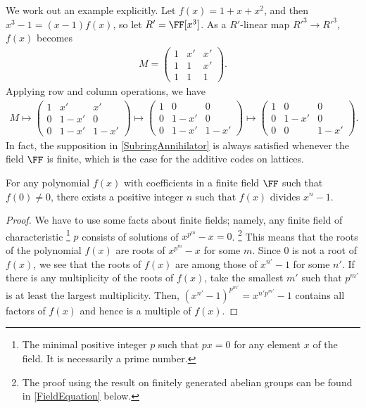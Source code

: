 We work out an example explicitly.
Let $f(x) = 1 + x + x^2$, and then $x^3 -1 = (x-1)f(x)$,
so let $R' = \FF[x^3]$.
As a $R'$-linear map $R'^3 \to R'^3$, $f(x)$ becomes
\begin{align}
M =
\begin{pmatrix}
1 & x' & x' \\
1 & 1 & x' \\
1 & 1 & 1
\end{pmatrix}.
\end{align}
Applying row and column operations, we have
\begin{align}
M \mapsto 
\begin{pmatrix}
1 & x' & x' \\
0 & 1-x' & 0 \\
0 & 1-x' & 1-x'
\end{pmatrix} \mapsto
\begin{pmatrix}
1 & 0 & 0 \\
0 & 1-x' & 0 \\
0 & 1-x' & 1-x'
\end{pmatrix}\mapsto
\begin{pmatrix}
1 & 0 & 0 \\
0 & 1-x' & 0 \\
0 & 0 & 1-x'
\end{pmatrix}.
\end{align}
In fact, the supposition in \ref{SubringAnnihilator}
is always satisfied whenever the field $\FF$ is finite,
which is the case for the additive codes on lattices.
\begin{prop}
For any polynomial $f(x)$ with coefficients in a finite field $\FF$ such that $f(0) \neq 0$,
there exists a positive integer $n$ such that $f(x)$ divides $x^n -1$.
\label{FFPolynomialFactor}
\end{prop}
\begin{proof}
We have to use some facts about finite fields;
namely, any finite field of characteristic%
\footnote{
The minimal positive integer $p$ such that
$p x = 0$ for any element $x$ of the field.
It is necessarily a prime number.
}
$p$ consists of solutions of $x^{p^m} -x = 0$.%
\footnote{
The proof using the result on finitely generated abelian groups can be found in
\ref{FieldEquation} below.
}
This means that the roots of the polynomial $f(x)$
are roots of $x^{p^m} -x$ for some $m$.
Since 0 is not a root of $f(x)$,
we see that the roots of $f(x)$ are among those of $x^{n'} -1$ for some $n'$.
If there is any multiplicity of the roots of $f(x)$,
take the smallest $m'$ such that $p^{m'}$
is at least the largest multiplicity.
Then, $(x^{n'} -1)^{p^{m'}} = x^{n' p^{m'}} -1$ contains
all factors of $f(x)$ and hence is a multiple of $f(x)$.
\end{proof}

